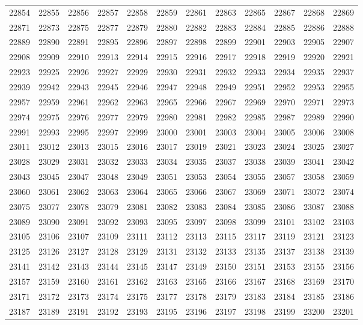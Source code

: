 \begin{center}
\begin{longtable}{llllllllllll}
22854 &22855 &22856 &22857 &22858 &22859 &22861 &22863 &22865 &22867 &22868 &22869 \\
22871 &22873 &22875 &22877 &22879 &22880 &22882 &22883 &22884 &22885 &22886 &22888 \\
22889 &22890 &22891 &22895 &22896 &22897 &22898 &22899 &22901 &22903 &22905 &22907 \\
22908 &22909 &22910 &22913 &22914 &22915 &22916 &22917 &22918 &22919 &22920 &22921 \\
22923 &22925 &22926 &22927 &22929 &22930 &22931 &22932 &22933 &22934 &22935 &22937 \\
22939 &22942 &22943 &22945 &22946 &22947 &22948 &22949 &22951 &22952 &22953 &22955 \\
22957 &22959 &22961 &22962 &22963 &22965 &22966 &22967 &22969 &22970 &22971 &22973 \\
22974 &22975 &22976 &22977 &22979 &22980 &22981 &22982 &22985 &22987 &22989 &22990 \\
22991 &22993 &22995 &22997 &22999 &23000 &23001 &23003 &23004 &23005 &23006 &23008 \\
23011 &23012 &23013 &23015 &23016 &23017 &23019 &23021 &23023 &23024 &23025 &23027 \\
23028 &23029 &23031 &23032 &23033 &23034 &23035 &23037 &23038 &23039 &23041 &23042 \\
23043 &23045 &23047 &23048 &23049 &23051 &23053 &23054 &23055 &23057 &23058 &23059 \\
23060 &23061 &23062 &23063 &23064 &23065 &23066 &23067 &23069 &23071 &23072 &23074 \\
23075 &23077 &23078 &23079 &23081 &23082 &23083 &23084 &23085 &23086 &23087 &23088 \\
23089 &23090 &23091 &23092 &23093 &23095 &23097 &23098 &23099 &23101 &23102 &23103 \\
23105 &23106 &23107 &23109 &23111 &23112 &23113 &23115 &23117 &23119 &23121 &23123 \\
23125 &23126 &23127 &23128 &23129 &23131 &23132 &23133 &23135 &23137 &23138 &23139 \\
23141 &23142 &23143 &23144 &23145 &23147 &23149 &23150 &23151 &23153 &23155 &23156 \\
23157 &23159 &23160 &23161 &23162 &23163 &23165 &23166 &23167 &23168 &23169 &23170 \\
23171 &23172 &23173 &23174 &23175 &23177 &23178 &23179 &23183 &23184 &23185 &23186 \\
23187 &23189 &23191 &23192 &23193 &23195 &23196 &23197 &23198 &23199 &23200 &23201 \\

\end{longtable}
\end{center}
